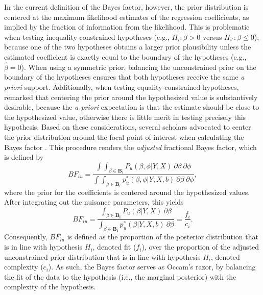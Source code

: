 \documentclass[
  authoryear,
  preprint,
  5p,
  twocolumn]{elsarticle}
\begin{document}
In the current definition of the Bayes factor, however, the prior
distribution is centered at the maximum likelihood estimates of the
regression coefficients, as implied by the fraction of information from
the likelihood. This is problematic when testing inequality-constrained
hypotheses (e.g., \(H_i: \beta > 0\) versus \(H_{i'}: \beta \leq 0\)),
because one of the two hypotheses obtains a larger prior plausibility
unless the estimated coefficient is exactly equal to the boundary of the
hypotheses (e.g., \(\hat{\beta}=0\)). When using a symmetric prior,
balancing the unconstrained prior on the boundary of the hypotheses
ensures that both hypotheses receive the same \emph{a priori} support.
Additionally, when testing equality-constrained hypotheses,
\citet{jeffreys_1961} remarked that centering the prior around the
hypothesized value is substantively desirable, because the \emph{a
priori} expectation is that the estimate should be close to the
hypothesized value, otherwise there is little merit in testing precisely
this hypothesis. Based on these considerations, several scholars
advocated to center the prior distribution around the focal point of
interest when calculating the Bayes factor
\citep{gu_approximated_2018, mulder_prior_2014, zellner_siow_1980, mulder_gu_bayesian_2021}.
This procedure renders the \emph{adjusted} fractional Bayes factor,
which is defined by \[
BF_{iu} = \frac{
  \int \int_{\beta \in \boldsymbol{B}_i} P_u(\beta, \phi | Y, X) ~ \partial \beta ~ \partial \phi
} {
  \int \int_{\beta \in \boldsymbol{B}_i} p^*_u(\beta, \phi| Y, X, b) ~ \partial \beta ~ \partial \phi
},
\] where the prior for the coefficients is centered around the
hypothesized values. After integrating out the nuisance parameters, this
yields \[
BF_{iu} = \frac{
  \int_{\beta \in \boldsymbol{B_i}} P_u (\beta | Y, X) ~ \partial \beta
}{
  \int_{\beta \in \boldsymbol{B_i}} p^*_u(\beta | Y, X, b) ~ \partial \beta
}
= \frac{f_i}{c_i}.
\] Consequently, \(BF_{iu}\) is defined as the proportion of the
posterior distribution that is in line with hypothesis \(H_i\), denoted
fit (\(f_i\)), over the proportion of the adjusted unconstrained prior
distribution that is in line with hypothesis \(H_i\), denoted complexity
(\(c_i\)). As such, the Bayes factor serves as Occam's razor, by
balancing the fit of the data to the hypothesis (i.e., the marginal
posterior) with the complexity of the hypothesis.
\end{document}
